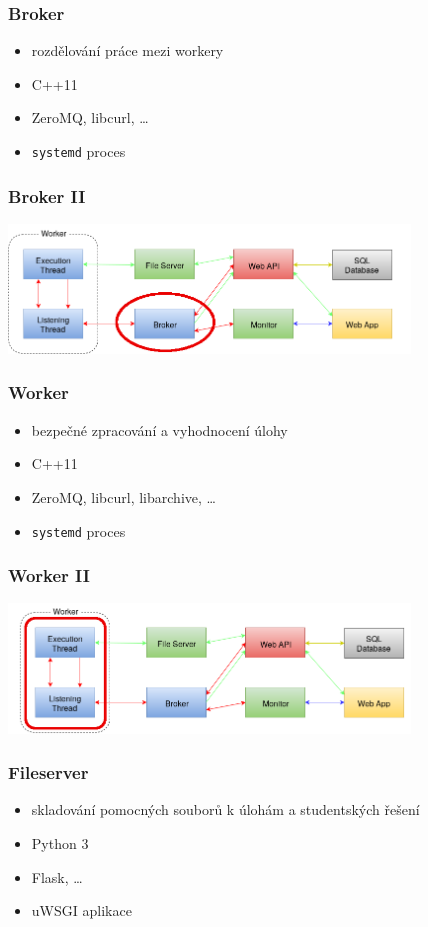 \documentclass{beamer}
\begin{document}
\begin{frame}
	\frametitle{Broker}
	\begin{itemize}
		\item rozdělování práce mezi workery
		\item C++11
		\item ZeroMQ, libcurl, \dots
		\item \texttt{systemd} proces
	\end{itemize}
\end{frame}

\begin{frame}
	\frametitle{Broker II}
	\begin{center}
		\includegraphics[width=0.8\textwidth]{images/communication-broker.png}
	\end{center}
\end{frame}

\begin{frame}
	\frametitle{Worker}
	\begin{itemize}
		\item bezpečné zpracování a vyhodnocení úlohy
		\item C++11
		\item ZeroMQ, libcurl, libarchive, \dots
		\item \texttt{systemd} proces
	\end{itemize}
\end{frame}

\begin{frame}
	\frametitle{Worker II}
	\begin{center}
		\includegraphics[width=0.8\textwidth]{images/communication-worker.png}
	\end{center}
\end{frame}

\begin{frame}
	\frametitle{Fileserver}
	\begin{itemize}
		\item skladování pomocných souborů k úlohám a studentských řešení
		\item Python 3
		\item Flask, \dots
		\item uWSGI aplikace
	\end{itemize}
\end{frame}
\end{document}
